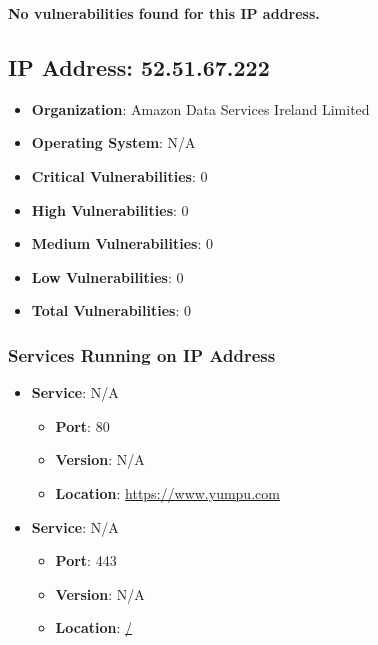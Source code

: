 \documentclass{article}
\begin{document}
\textbf{No vulnerabilities found for this IP address.}




\clearpage



\subsection{IP Address: 52.51.67.222}

\begin{itemize}
    \item \textbf{Organization}: Amazon Data Services Ireland Limited
    \item \textbf{Operating System}:  N/A 
    \item \textbf{Critical Vulnerabilities}: 0
    \item \textbf{High Vulnerabilities}: 0
    \item \textbf{Medium Vulnerabilities}: 0
    \item \textbf{Low Vulnerabilities}: 0
    \item \textbf{Total Vulnerabilities}: 0
\end{itemize}

\subsubsection*{Services Running on IP Address}

\begin{itemize}
    
        \item \textbf{Service}: N/A
        \begin{itemize}
            \item \textbf{Port}: 80
            \item \textbf{Version}:  N/A 
            \item \textbf{Location}: \href{ https://www.yumpu.com }{ https://www.yumpu.com }
        \end{itemize}
    
        \item \textbf{Service}: N/A
        \begin{itemize}
            \item \textbf{Port}: 443
            \item \textbf{Version}:  N/A 
            \item \textbf{Location}: \href{ / }{ / }
        \end{itemize}
    
\end{itemize}
\end{document}
